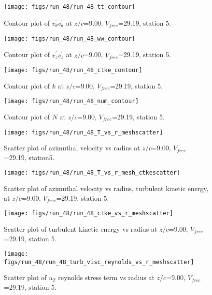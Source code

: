 \begin{figure}[H]
\centering
\texttt{[image: figs/run\_48/run\_48\_tt\_contour]}
\caption{Contour plot of $\overline{v_{\theta}^{\prime} v_{\theta}^{\prime}}$ at $z/c$=9.00, $V_{free}$=29.19, station 5.}
\end{figure}


\begin{figure}[H]
\centering
\texttt{[image: figs/run\_48/run\_48\_ww\_contour]}
\caption{Contour plot of $\overline{v_{z}^{\prime} v_{z}^{\prime}}$ at $z/c$=9.00, $V_{free}$=29.19, station 5.}
\end{figure}


\begin{figure}[H]
\centering
\texttt{[image: figs/run\_48/run\_48\_ctke\_contour]}
\caption{Contour plot of $k$ at $z/c$=9.00, $V_{free}$=29.19, station 5.}
\end{figure}


\begin{figure}[H]
\centering
\texttt{[image: figs/run\_48/run\_48\_num\_contour]}
\caption{Contour plot of $N$ at $z/c$=9.00, $V_{free}$=29.19, station 5.}
\end{figure}


\begin{figure}[H]
\centering
\texttt{[image: figs/run\_48/run\_48\_T\_vs\_r\_meshscatter]}
\caption{Scatter plot of azimuthal velocity vs radius at $z/c$=9.00, $V_{free}$=29.19, station5.}
\end{figure}


\begin{figure}[H]
\centering
\texttt{[image: figs/run\_48/run\_48\_T\_vs\_r\_mesh\_ctkescatter]}
\caption{Scatter plot of azimuthal velocity vs radius, turbulent kinetic energy, at $z/c$=9.00, $V_{free}$=29.19, station 5.}
\end{figure}


\begin{figure}[H]
\centering
\texttt{[image: figs/run\_48/run\_48\_ctke\_vs\_r\_meshscatter]}
\caption{Scatter plot of turbulent kinetic energy vs radius at $z/c$=9.00, $V_{free}$=29.19, station 5.}
\end{figure}


\begin{figure}[H]
\centering
\texttt{[image: figs/run\_48/run\_48\_turb\_visc\_reynolds\_vs\_r\_meshscatter]}
\caption{Scatter plot of $
u_T$ reynolds stress term vs radius at $z/c$=9.00, $V_{free}$=29.19, station 5.}
\end{figure}


